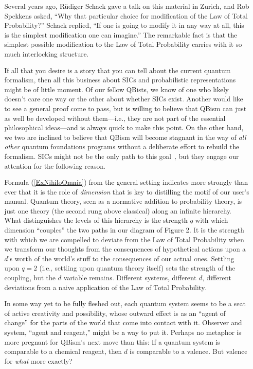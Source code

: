 \documentclass[aps,pra,superscriptaddress,12pt,tightenlines,nofootinbib]{revtex4-2}
\begin{document}
Several years ago, R\"udiger Schack gave a talk on this material in Zurich, and Rob Spekkens asked, ``Why that particular choice for modification of the Law of Total Probability?''  Schack replied, ``If one is going to modify it in any way at all, this is the simplest modification one can imagine.''  The remarkable fact is that the simplest possible modification to the Law of Total Probability carries with it so much interlocking structure.

If all that you desire is a story that you can tell about the current quantum formalism, then all this business about SICs and probabilistic representations might be of little moment.  Of our fellow QBists, we know of one who likely doesn't care one way or the other about whether SICs exist.  Another would like to see a general proof come to pass, but is willing to believe that QBism can just as well be developed without them---i.e., they are not part of the essential philosophical ideas---and is always quick to make this point.  On the other hand, we two are inclined to believe that QBism will become stagnant in the way of {\it all other\/} quantum foundations programs without a deliberate effort to rebuild the formalism.  SICs might not be the only path to this goal~\cite{FQXi}, but they engage our attention for the following reason.

Formula (\ref{ExNihiloOmnia}) from the general setting indicates more strongly than ever that it is the role of {\it dimension\/} that is key to distilling the motif of our user's manual.  Quantum theory, seen as a normative addition to probability theory, is just one theory (the second rung above classical) along an infinite hierarchy.  What distinguishes the levels of this hierarchy is the strength $q$ with which dimension ``couples'' the two paths in our diagram of Figure 2.  It is the strength with which we are compelled to deviate from the Law of Total Probability when we transform our thoughts from the consequences of hypothetical actions upon a $d$'s worth of the world's stuff to the consequences of our actual ones.  Settling upon $q=2$ (i.e., settling upon quantum theory itself) sets the strength of the coupling, but the $d$ variable remains.  Different systems, different $d$, different deviations from a naive application of the Law of Total Probability.

In some way yet to be fully fleshed out, each quantum system seems to be a seat of active creativity and possibility, whose outward effect is as an ``agent of change'' for the parts of the world that come into contact with it.  Observer and system, ``agent and reagent,'' might be a way to put it.  Perhaps no metaphor is more pregnant for QBism's next move than this:  If a quantum system is comparable to a chemical reagent, then $d$ is comparable to a valence.  But valence for {\it what\/} more exactly?
\end{document}
